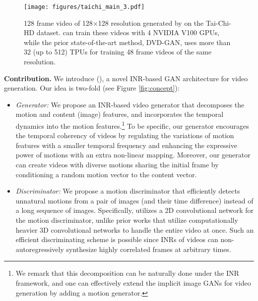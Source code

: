 \documentclass{article} \usepackage{iclr2022_conference,times}
\begin{document}
\begin{figure*}[t]
\vspace{-0.1in}
\begin{center}
\texttt{[image: figures/taichi\_main\_3.pdf]}
\end{center}
\vspace{-0.15in}
\caption{
128 frame video of 128$\times$128 resolution generated by \sname on the Tai-Chi-HD dataset. 
\sname can train
these videos with 4 NVIDIA V100 GPUs, while the prior state-of-the-art method, DVD-GAN, uses more than 32 (up to 512) TPUs for training 48 frame videos of the same resolution.
}\label{fig:intro}
\vspace{-0.1in}
\end{figure*}

 
\textbf{Contribution.} 
We introduce \emph{\lname} (\sname), a novel INR-based GAN architecture for video generation. Our idea is two-fold (see Figure \ref{fig:concept}):
\begin{itemize}[topsep=0.0pt,itemsep=1.0pt,leftmargin=5.5mm]
    \item \emph{Generator:}
    We propose an INR-based video generator that decomposes the motion and content (image) features, and incorporates the temporal dynamics into the motion features.\footnote{We remark that this decomposition can be naturally done under the INR framework, and one can effectively extend the implicit image GANs for video generation by adding a motion generator.}
    To be specific, our generator encourages the temporal coherency of videos by regulating the variations of motion features with a smaller temporal frequency and enhancing the expressive power of motions with an extra non-linear mapping. Moreover, our generator can create videos with diverse motions sharing the initial frame by conditioning a random motion vector to the content vector.

    \item \emph{Discriminator:} 
    We propose a motion discriminator that efficiently detects unnatural motions from a pair of images (and their time difference) instead of a long sequence of images. Specifically, \sname utilizes a 2D convolutional network for the motion discriminator, unlike prior works that utilize computationally heavier 3D convolutional networks to handle the entire video at once. Such an efficient discriminating scheme is possible since INRs of videos can non-autoregressively synthesize highly correlated frames at arbitrary times.
\end{itemize}
\end{document}
